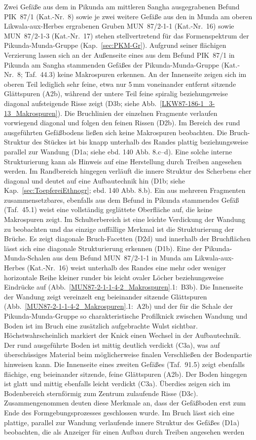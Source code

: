 Zwei Gefäße aus dem in Pikunda am mittleren Sangha ausgegrabenen Befund PIK~87/1 (Kat.-Nr.~8) sowie je zwei weitere Gefäße aus den in Munda am oberen Likwala-aux-Herbes ergrabenen Gruben MUN~87/2-1-1 (Kat.-Nr.~16) sowie MUN~87/2-1-3 (Kat.-Nr.~17) stehen stellvertretend für das Formenspektrum der Pikunda-Munda-Gruppe (Kap.~\ref{sec:PKM-Gr}). Aufgrund seiner flächigen Verzierung lassen sich an der Außenseite eines aus dem Befund PIK~87/1 in Pikunda am Sangha stammenden Gefäßes der Pikunda-Munda-Gruppe (Kat.-Nr.~8; Taf.~44.3) keine Makrospuren erkennen. An der Innenseite zeigen sich im oberen Teil lediglich sehr feine, etwa nur 5\,mm voneinander entfernt sitzende Glättspuren (A2b), während der untere Teil feine spiralig beziehungsweise diagonal aufsteigende Risse zeigt (D3b; siehe Abb.~\ref{LKW87-186-1_3-13_Makrospuren}). Die Bruchlinien der einzelnen Fragmente verlaufen vorwiegend diagonal und folgen den feinen Rissen (D2b). Im Bereich des rund ausgeführten Gefäßbodens ließen sich keine Makrospuren beobachten. Die Bruch-Struktur des Stückes ist bis knapp unterhalb des Randes plattig beziehungsweise parallel zur Wandung (D1a; siehe ebd. 140 Abb. 8.c--d). Eine solche interne Strukturierung kann als Hinweis auf eine Herstellung durch Treiben angesehen werden. Im Randbereich hingegen verläuft die innere Struktur des Scherbens eher diagonal und deutet auf eine Aufbautechnik hin (D1b; siehe Kap.~\ref{sec:ToepfereiEthnogr}; ebd. 140 Abb. 8.b). Ein aus mehreren Fragmenten zusammensetzbares, ebenfalls aus dem Befund in Pikunda stammendes Gefäß (Taf.~45.1) weist eine vollständig geglättete Oberfläche auf, die keine Makrospuren zeigt. Im Schulterbereich ist eine leichte Verdickung der Wandung zu beobachten und das einzige auffällige Merkmal ist die Strukturierung der Brüche. Es zeigt diagonale Bruch-Facetten (D2d) und innerhalb der Bruchflächen lässt sich eine diagonale Strukturierung erkennen (D1b). Eine der Pikunda-Munda-Schalen aus dem Befund MUN~87/2-1-1 in Munda am Likwala-aux-Herbes (Kat.-Nr.~16) weist unterhalb des Randes eine mehr oder weniger horizontale Reihe kleiner runder bis leicht ovaler Löcher beziehungsweise Eindrücke auf (Abb.~\ref{MUN87-2-1-1-4-2_Makrospuren}.1:~B3b). Die Innenseite der Wandung zeigt vereinzelt eng beieinander sitzende Glättspuren (Abb.~\ref{MUN87-2-1-1-4-2_Makrospuren}.1:~A2b) und der für die Schale der Pikunda-Munda-Gruppe so charakteristische Profilknick zwischen Wandung und Boden ist im Bruch eine zusätzlich aufgebrachte Wulst sichtbar. Höchstwahrscheinlich markiert der Knick einen Wechsel in der Aufbautechnik. Der rund ausgeführte Boden ist mittig deutlich verdickt (C3a), was auf überschüssiges Material beim möglicherweise finalen Verschließen der Bodenpartie hinweisen kann. Die Innenseite eines zweiten Gefäßes (Taf.~91.5) zeigt ebenfalls flächige, eng beieinander sitzende, feine Glättspuren (A2b). Der Boden hingegen ist glatt und mittig ebenfalls leicht verdickt (C3a). Überdies zeigen sich im Bodenbereich sternförmig zum Zentrum zulaufende Risse (D3c). Zusammengenommen deuten diese Merkmale an, dass der Gefäßboden erst zum Ende des Formgebungsprozesses geschlossen wurde. Im Bruch lässt sich eine plattige, parallel zur Wandung verlaufende innere Struktur des Gefäßes (D1a) beobachten, die als Anzeiger für einen Aufbau durch Treiben angesehen werden 